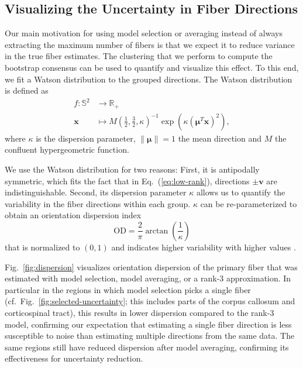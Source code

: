 \subsection{Visualizing the Uncertainty in Fiber Directions}
\label{sec:vis-uncertainty-reduction}

Our main motivation for using model selection or averaging instead of always extracting the maximum number of fibers is that we expect it to reduce variance in the true fiber estimates. The clustering that we perform to compute the bootstrap consensus can be used to quantify and visualize this effect. To this end, we fit a Watson
distribution to the grouped directions. The Watson distribution is defined as  \cite{jupp_mardia_1999}
\begin{align*}
	f : \mathbb{S}^2 & \longrightarrow  \mathbb{R}_+ \\
	\mathbf{x} & \longmapsto  M \left( \frac{1}{2}, \frac{3}{2} , \kappa
	\right)^{-1} \exp \left(  \kappa
	\left( \mathbf{\mu}^T \mathbf{x} \right)^2 
	\right) 	,  
\end{align*}
where $\kappa$ is the dispersion parameter, $\| \mathbf{\mu} \| = 1$ the
mean direction and $M$ the confluent hypergeometric function. 

We use the Watson distribution for two reasons: First, it is antipodally symmetric,
which fits the fact that in Eq.~(\ref{eq:low-rank}), directions $\pm \mathbf{v}$
are indistinguishable. Second, its dispersion parameter $\kappa$ allows us to quantify the variability in the fiber directions within each group. $\kappa$ can be re-parameterized to obtain an orientation dispersion index
\[ \mathrm{OD} = \frac{2}{\pi} \arctan \left( \frac{1}{\kappa} \right) \]
that is normalized to $(0,1)$ and indicates higher variability with higher values \cite{dispersionParameter}.

Fig.~\ref{fig:dispersion} visualizes orientation dispersion of the primary fiber that was estimated with model selection, model averaging, or a rank-3 approximation. In particular in the regions in which model selection picks a single fiber (cf.\ Fig.~\ref{fig:selected-uncertainty}; this includes parts of the corpus callosum and corticospinal tract), this results in lower dispersion 
compared to the rank-$3$ model, confirming our expectation that estimating a single fiber direction is less susceptible to noise than estimating multiple directions from the same data. The same regions still have reduced dispersion after model averaging, confirming its effectiveness for uncertainty reduction.




